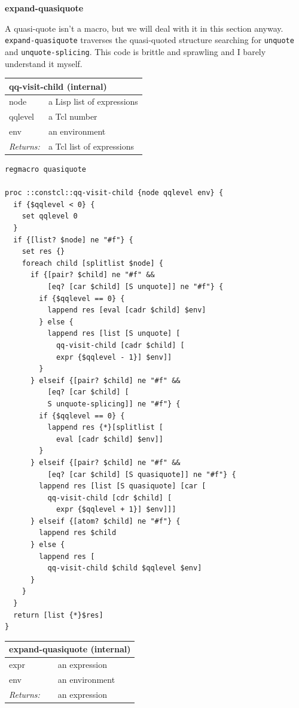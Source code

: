 \documentclass[twoside,9pt]{report}
\begin{document}
\textbf{expand-quasiquote}


A quasi-quote isn't a macro, but we will deal with it in this section anyway. \texttt{expand-quasiquote} traverses the quasi-quoted structure searching for \texttt{unquote} and \texttt{unquote-splicing}. This code is brittle and sprawling and I barely understand it myself.

\begin{tabular}{ |l l| }
\hline
\multicolumn{2}{|l|}{qq-visit-child (internal)} \\
\hline
node & a Lisp list of expressions \\
qqlevel & a Tcl number \\
env & an environment \\
\textit{Returns:} & a Tcl list of expressions \\
\hline
\end{tabular}

\noindent\makebox[\linewidth]{\rule{\linewidth}{0.4pt}}
\begin{lstlisting}
regmacro quasiquote
 
proc ::constcl::qq-visit-child {node qqlevel env} {
  if {$qqlevel < 0} {
    set qqlevel 0
  }
  if {[list? $node] ne "#f"} {
    set res {}
    foreach child [splitlist $node] {
      if {[pair? $child] ne "#f" &&
          [eq? [car $child] [S unquote]] ne "#f"} {
        if {$qqlevel == 0} {
          lappend res [eval [cadr $child] $env]
        } else {
          lappend res [list [S unquote] [
            qq-visit-child [cadr $child] [
            expr {$qqlevel - 1}] $env]]
        }
      } elseif {[pair? $child] ne "#f" &&
          [eq? [car $child] [
          S unquote-splicing]] ne "#f"} {
        if {$qqlevel == 0} {
          lappend res {*}[splitlist [
            eval [cadr $child] $env]]
        }
      } elseif {[pair? $child] ne "#f" &&
          [eq? [car $child] [S quasiquote]] ne "#f"} {
        lappend res [list [S quasiquote] [car [
          qq-visit-child [cdr $child] [
            expr {$qqlevel + 1}] $env]]] 
      } elseif {[atom? $child] ne "#f"} {
        lappend res $child
      } else {
        lappend res [
          qq-visit-child $child $qqlevel $env]
      }
    }
  }
  return [list {*}$res]
}
\end{lstlisting}
\noindent\makebox[\linewidth]{\rule{\linewidth}{0.4pt}}
\begin{tabular}{ |l l| }
\hline
\multicolumn{2}{|l|}{expand-quasiquote (internal)} \\
\hline
expr & an expression \\
env & an environment \\
\textit{Returns:} & an expression \\
\hline
\end{tabular}
\end{document}
